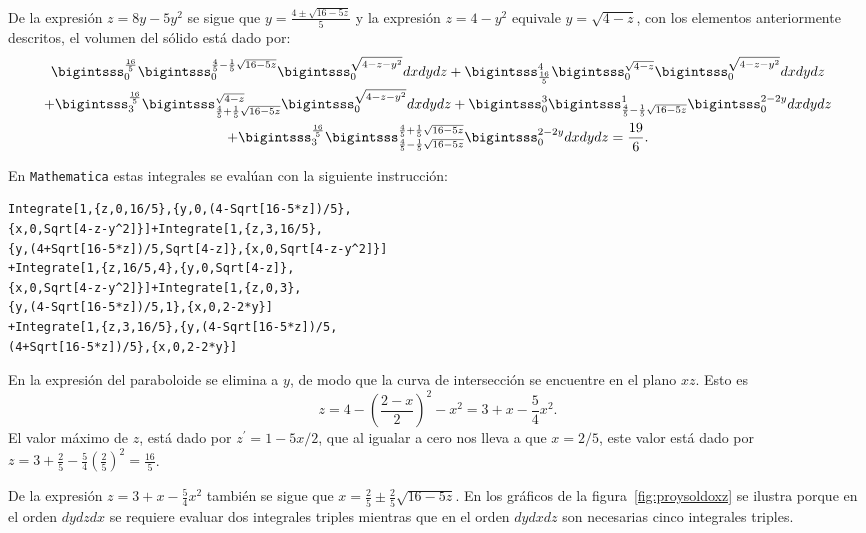 De la expresión $z=8y-5y^2$ se sigue que
$y=\frac{4 \pm \sqrt{16-5z}}{5}$ y la expresión $z= 4-y^2$
equivale $y=\sqrt{4-z}$, con los elementos anteriormente descritos, el volumen del sólido está dado por:
%
{\footnotesize
\begin{multline*}
\bigintsss_{0}^{\frac{16}{5}}\bigintsss_{0}^{\frac{4}{5}-\frac{1}{5}\sqrt{16-5z}}\bigintsss_{0}^{\sqrt{4-z-y^2}}dxdydz
+\bigintsss_{\frac{16}{5}}^{4}\bigintsss_{0}^{\sqrt{4-z}}\bigintsss_{0}^{\sqrt{4-z-y^2}}dxdydz \\
+\bigintsss_{3}^{\frac{16}{5}}\bigintsss_{\frac{4}{5}+\frac{1}{5}\sqrt{16-5z}}^{\sqrt{4-z}}\bigintsss_{0}^{\sqrt{4-z-y^2}}dxdydz +\bigintsss_{0}^{3}\bigintsss_{\frac{4}{5}-\frac{1}{5}\sqrt{16-5z}}^{1}\bigintsss_{0}^{2-2y}dxdydz\\
+\bigintsss_{3}^{\frac{16}{5}}\bigintsss_{\frac{4}{5}-\frac{1}{5}\sqrt{16-5z}}^{\frac{4}{5}+\frac{1}{5}\sqrt{16-5z}}\bigintsss_{0}^{2-2y}dxdydz= \frac{19}{6}.
\end{multline*}
}

En \verb"Mathematica" estas integrales se evalúan con la siguiente instrucción:

\begin{tcolorbox}[title=\bf Instrucción en \verb"Mathematica"]\begin{Verbatim}[formatcom=\letraverbatim]
Integrate[1,{z,0,16/5},{y,0,(4-Sqrt[16-5*z])/5},
{x,0,Sqrt[4-z-y^2]}]+Integrate[1,{z,3,16/5},
{y,(4+Sqrt[16-5*z])/5,Sqrt[4-z]},{x,0,Sqrt[4-z-y^2]}]
+Integrate[1,{z,16/5,4},{y,0,Sqrt[4-z]},
{x,0,Sqrt[4-z-y^2]}]+Integrate[1,{z,0,3},
{y,(4-Sqrt[16-5*z])/5,1},{x,0,2-2*y}]
+Integrate[1,{z,3,16/5},{y,(4-Sqrt[16-5*z])/5,
(4+Sqrt[16-5*z])/5},{x,0,2-2*y}]
\end{Verbatim}
\end{tcolorbox}

En la expresión del paraboloide se elimina a $y$, de modo que la curva de intersección se encuentre en el plano $xz$. Esto es
\[z= 4- \left ( \frac{2-x}{2} \right ) ^2-x^2= 3+x- \frac{5}{4}x^2.\]
El valor máximo de $z$, está dado por
$z^\prime= 1-5x/2$, que al igualar a cero nos lleva a que $x=2/5$, este valor está dado por
$z=3+\frac{2}{5}-\frac{5}{4}\left(\frac{2}{5}\right)^2=\frac{16}{5}$.

De la expresión $z=3+x- \frac{5}{4}x^2$
también se sigue que $x=\frac{2}{5} \pm \frac{2}{5} \sqrt{16-5z}$. En los gráficos de la figura~\ref{fig:proysoldoxz} se ilustra porque en el orden $dydzdx$ se requiere evaluar dos integrales triples mientras que en el orden $dydxdz$ son necesarias cinco integrales triples.

